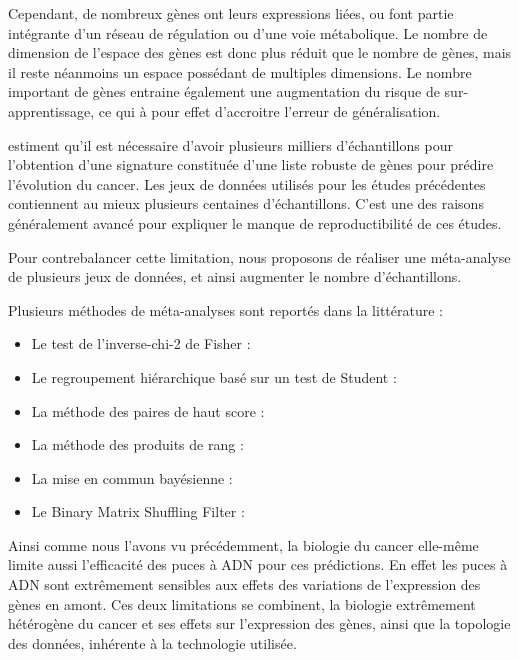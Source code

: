 			Cependant, de nombreux gènes ont leurs expressions liées, ou font partie intégrante d'un réseau de régulation ou d'une voie métabolique.
			Le nombre de dimension de l'espace des gènes est donc plus réduit que le nombre de gènes, mais il reste néanmoins un espace possédant de multiples dimensions.
			Le nombre important de gènes entraine également une augmentation du risque de sur-apprentissage, ce qui à pour effet d'accroitre l'erreur de généralisation.

			\pagebreak

			\citeauthor{EinDor2006} estiment qu'il est nécessaire d'avoir plusieurs milliers d'échantillons pour l'obtention d'une signature constituée d'une liste robuste de gènes pour prédire l'évolution du cancer.
			Les jeux de données utilisés pour les études précédentes \citep{vandevijver2002,Wang2005} contiennent au mieux plusieurs centaines d'échantillons.
			C'est une des raisons généralement avancé pour expliquer le manque de reproductibilité de ces études.

			Pour contrebalancer cette limitation, nous proposons de réaliser une méta-analyse de plusieurs jeux de données, et ainsi augmenter le nombre d'échantillons.

			Plusieurs méthodes de méta-analyses sont reportés dans la littérature :
			\begin{itemize}
				\item Le test de l'inverse-chi-2 de Fisher : \citet{Fisher1925}
				\item Le regroupement hiérarchique basé sur un test de Student : \citet{Gentleman2004}
				\item La méthode des paires de haut score : \citet{Xu2005}
				\item La méthode des produits de rang : \citet{Hong2006}
				\item La mise en commun bayésienne : \citet{Conlon2006}
				\item Le Binary Matrix Shuffling Filter : \citet{Zhang2012e}
			\end{itemize}

			Ainsi comme nous l'avons vu précédemment, la biologie du cancer elle-même limite aussi l'efficacité des puces à \acs{ADN} pour ces prédictions.
			En effet les puces à \acs{ADN} sont extrêmement sensibles aux effets des variations de l'expression des gènes en amont.
			Ces deux limitations se combinent, la biologie extrêmement hétérogène du cancer et ses effets sur l'expression des gènes, ainsi que la topologie des données, inhérente à la technologie utilisée.

